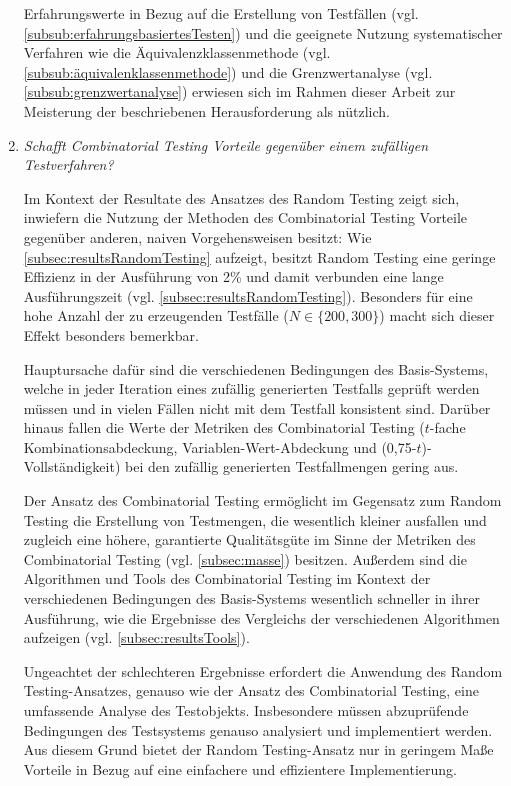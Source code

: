 \begin{enumerate}
Erfahrungswerte in Bezug auf die Erstellung von Testfällen (vgl. \autoref{subsub:erfahrungsbasiertesTesten}) und die geeignete Nutzung systematischer Verfahren wie die Äquivalenzklassenmethode (vgl. \autoref{subsub:äquivalenklassenmethode}) und die Grenzwertanalyse (vgl. \autoref{subsub:grenzwertanalyse}) erwiesen sich im Rahmen dieser Arbeit zur Meisterung der beschriebenen Herausforderung als nützlich.

\item \textit{Schafft Combinatorial Testing Vorteile gegenüber einem zufälligen Testverfahren?}

Im Kontext der Resultate des Ansatzes des Random Testing zeigt sich, inwiefern die Nutzung der Methoden des Combinatorial Testing Vorteile gegenüber anderen, naiven Vorgehensweisen besitzt: Wie \autoref{subsec:resultsRandomTesting} aufzeigt, besitzt Random Testing eine geringe Effizienz in der Ausführung von 2\% und damit verbunden eine lange Ausführungszeit (vgl. \autoref{subsec:resultsRandomTesting}). Besonders für eine hohe Anzahl der zu erzeugenden Testfälle ($N \in \{200,300\}$) macht sich dieser Effekt besonders bemerkbar. 

Hauptursache dafür sind die verschiedenen Bedingungen des Basis-Systems, welche in jeder Iteration eines zufällig generierten Testfalls geprüft werden müssen und in vielen Fällen nicht mit dem Testfall konsistent sind. Darüber hinaus fallen die Werte der Metriken des Combinatorial Testing ($t$-fache Kombinationsabdeckung, Variablen-Wert-Abdeckung und (0,75-$t$)-Vollständigkeit) bei den zufällig generierten Testfallmengen gering aus. 

Der Ansatz des Combinatorial Testing ermöglicht im Gegensatz zum Random Testing die Erstellung von Testmengen, die wesentlich kleiner ausfallen und zugleich eine höhere, garantierte Qualitätsgüte im Sinne der Metriken des Combinatorial Testing (vgl. \autoref{subsec:masse}) besitzen. Außerdem sind die Algorithmen und Tools des Combinatorial Testing im Kontext der verschiedenen Bedingungen des Basis-Systems wesentlich schneller in ihrer Ausführung, wie die Ergebnisse des Vergleichs der verschiedenen Algorithmen aufzeigen (vgl. \autoref{subsec:resultsTools}).

Ungeachtet der schlechteren Ergebnisse erfordert die Anwendung des Random Testing-Ansatzes, genauso wie der Ansatz des Combinatorial Testing, eine umfassende Analyse des Testobjekts. Insbesondere müssen abzuprüfende Bedingungen des Testsystems genauso analysiert und implementiert werden. Aus diesem Grund bietet der Random Testing-Ansatz nur in geringem Maße Vorteile in Bezug auf eine einfachere und effizientere Implementierung.


\end{enumerate}
